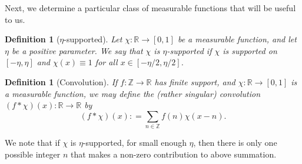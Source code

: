 \documentclass[12pt,a4paper,twoside,reqno]{amsart}
\newtheorem{Definition}[Theorem]{Definition}
\numberwithin{equation}{section}
\begin{document}
Next, we determine a particular class of measurable functions that will be useful to us. 

\begin{Definition}[$\eta$-supported]
\label{Defintion eta supported}
Let $\chi:\mathbb{R}\longrightarrow [0,1]$ be a measurable function, and let $\eta$ be a positive parameter. We say that $\chi$ is \emph{$\eta$-supported} if $\chi$ is supported on $[-\eta,\eta]$ and $\chi(x) \equiv 1$ for all $x\in [-\eta/2,\eta/2]$. 
\end{Definition}

\begin{Definition}[Convolution]
If $f:\mathbb{Z}\longrightarrow \mathbb{R}$ has finite support, and $\chi:\mathbb{R}\longrightarrow [0,1]$ is a measurable function, we may define the (rather singular) convolution  $(f\ast \chi)(x) : \mathbb{R}\longrightarrow \mathbb{R}$ by \[ (f\ast \chi)(x): = \sum\limits_{n\in \mathbb{Z}} f(n) \chi(x -n).\] 
\end{Definition}
We note that if $\chi$ is $\eta$-supported, for small enough $\eta$, then there is only one possible integer $n$ that makes a non-zero contribution to above summation. \\
\end{document}
